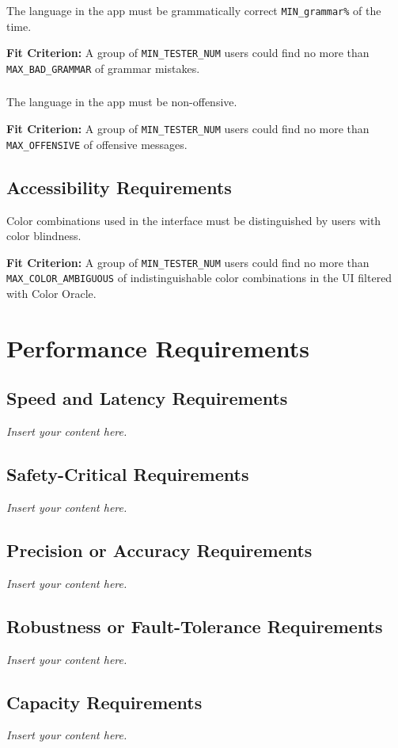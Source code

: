 \documentclass[12pt]{article}
\newcommand{\lips}{\textit{Insert your content here.}}
\begin{document}
\subsubsection{}
The language in the app must be grammatically correct \texttt{MIN\_grammar\%} of the time.

\textbf{Fit Criterion:} A group of \texttt{MIN\_TESTER\_NUM}  users could find no more than \texttt{MAX\_BAD\_GRAMMAR} of grammar mistakes.

\subsubsection{}
The language in the app must be non-offensive.

\textbf{Fit Criterion:} A group of \texttt{MIN\_TESTER\_NUM} users could find no more than \texttt{MAX\_OFFENSIVE} of offensive messages.
\subsection{Accessibility Requirements}
Color combinations used in the interface must be distinguished by users with color blindness.

\textbf{Fit Criterion:} A group of \texttt{MIN\_TESTER\_NUM} users could find no more than \texttt{MAX\_COLOR\_AMBIGUOUS} of indistinguishable color combinations in the UI filtered with Color Oracle.

\section{Performance Requirements}
\subsection{Speed and Latency Requirements}
\lips
\subsection{Safety-Critical Requirements}
\lips
\subsection{Precision or Accuracy Requirements}
\lips
\subsection{Robustness or Fault-Tolerance Requirements}
\lips
\subsection{Capacity Requirements}
\lips
\end{document}
